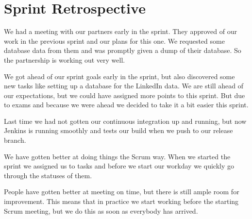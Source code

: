 \section{Sprint Retrospective}

We had a meeting with our partners early in the sprint. They approved of
our work in the previous sprint and our plans for this one. We requested
some database data from them and was promptly given a dump of their
database. So the partnership is working out very well.

We got ahead of our sprint goals early in the sprint, but also discovered
some new tasks like setting up a database for the LinkedIn data. We are
still ahead of our expectations, but we could have assigned more points to
this sprint. But due to exams and because we were ahead we decided to take
it a bit easier this sprint.

Last time we had not gotten our continuous integration up and running, but
now Jenkins is running smoothly and tests our build when we push to our
release branch.

We have gotten better at doing things the Scrum way. When we started the
sprint we assigned us to tasks and before we start our workday we quickly
go through the statuses of them. 

People have gotten better at meeting on time, but there is still ample
room for improvement. This means that in practice we start working before
the starting Scrum meeting, but we do this as soon as everybody has
arrived.


